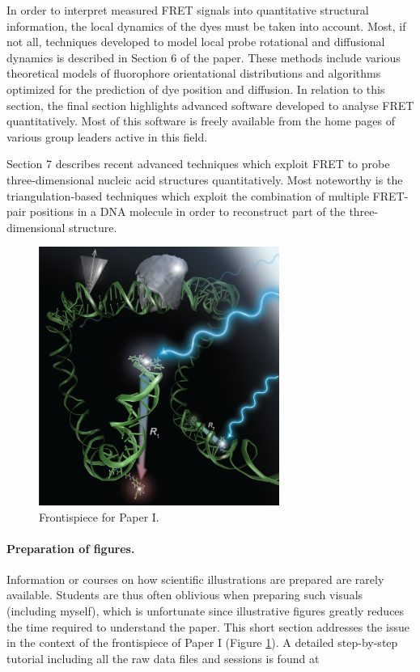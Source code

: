  In order to interpret measured FRET signals into quantitative structural information, the local dynamics of the dyes must be taken into account. Most, if not all, techniques developed to model local probe rotational and diffusional dynamics is described in Section 6 of the paper. These methods include various theoretical models of fluorophore orientational distributions and algorithms optimized for the prediction of dye position and diffusion. In relation to this section, the final section highlights advanced software developed to analyse FRET quantitatively. Most of this software is freely available from the home pages of various group leaders active in this field.

 Section 7 describes recent advanced techniques which exploit FRET to probe three-dimensional nucleic acid structures quantitatively. Most noteworthy is the triangulation-based techniques which exploit the combination of multiple FRET-pair positions in a DNA molecule in order to reconstruct part of the three-dimensional structure.\cite{Muschielok2008,Muschielok2011,Sabir2011,Sabir2012,Wozniak2008,Andrecka2008,Andrecka2009,Balci2011}

\begin{figure}
    \centering
        \includegraphics[width=0.7\textwidth]{adds//cbc_fig2.png}
    \captionsetup{width=.95\textwidth}
    \caption{Frontispiece for Paper I.}
    \label{Fig:chap_Papers_CBC}
\end{figure}

 \paragraph{Preparation of figures.} Information or courses on how scientific illustrations are prepared are rarely available. Students are thus often oblivious when preparing such visuals (including myself), which is unfortunate since illustrative figures greatly reduces the time required to understand the paper. This short section addresses the issue in the context of the frontispiece of Paper I (Figure \ref{Fig:chap_Papers_CBC}). A detailed step-by-step tutorial including all the raw data files and sessions is found at

